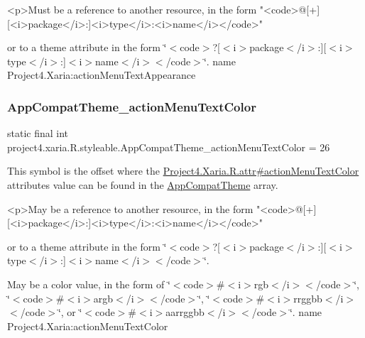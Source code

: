 \begin{DoxyVerb}      <p>Must be a reference to another resource, in the form "<code>@[+][<i>package</i>:]<i>type</i>:<i>name</i></code>"
\end{DoxyVerb}
 or to a theme attribute in the form \char`\"{}$<$code$>$?\mbox{[}$<$i$>$package$<$/i$>$\+:\mbox{]}\mbox{[}$<$i$>$type$<$/i$>$\+:\mbox{]}$<$i$>$name$<$/i$>$$<$/code$>$\char`\"{}.  name Project4.\+Xaria\+:action\+Menu\+Text\+Appearance \mbox{\label{classproject4_1_1xaria_1_1R_1_1styleable_a3a86c177d90451263e2f960e5e8dd93f}} 
\subsubsection{\texorpdfstring{App\+Compat\+Theme\+\_\+action\+Menu\+Text\+Color}{AppCompatTheme\_actionMenuTextColor}}
{\footnotesize\ttfamily static final int project4.\+xaria.\+R.\+styleable.\+App\+Compat\+Theme\+\_\+action\+Menu\+Text\+Color = 26\hspace{0.3cm}{\ttfamily [static]}}

This symbol is the offset where the \hyperlink{}{Project4.\+Xaria.\+R.\+attr\#action\+Menu\+Text\+Color} attribute\textquotesingle{}s value can be found in the \hyperlink{classproject4_1_1xaria_1_1R_1_1styleable_aad8bec413e2350f9404e6ff0e831a85d}{App\+Compat\+Theme} array.

\begin{DoxyVerb}      <p>May be a reference to another resource, in the form "<code>@[+][<i>package</i>:]<i>type</i>:<i>name</i></code>"
\end{DoxyVerb}
 or to a theme attribute in the form \char`\"{}$<$code$>$?\mbox{[}$<$i$>$package$<$/i$>$\+:\mbox{]}\mbox{[}$<$i$>$type$<$/i$>$\+:\mbox{]}$<$i$>$name$<$/i$>$$<$/code$>$\char`\"{}. 

May be a color value, in the form of \char`\"{}$<$code$>$\#$<$i$>$rgb$<$/i$>$$<$/code$>$\char`\"{}, \char`\"{}$<$code$>$\#$<$i$>$argb$<$/i$>$$<$/code$>$\char`\"{}, \char`\"{}$<$code$>$\#$<$i$>$rrggbb$<$/i$>$$<$/code$>$\char`\"{}, or \char`\"{}$<$code$>$\#$<$i$>$aarrggbb$<$/i$>$$<$/code$>$\char`\"{}.  name Project4.\+Xaria\+:action\+Menu\+Text\+Color \mbox{\label{classproject4_1_1xaria_1_1R_1_1styleable_a1456e2fb73b019f4b692d2ba615b5933}} 
